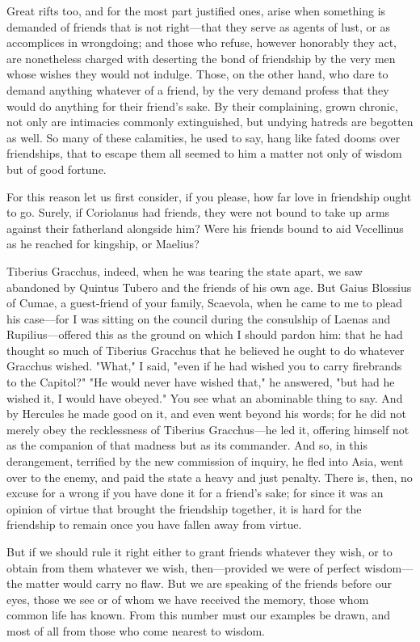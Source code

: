  Great rifts too, and for the most part justified ones, arise when something is demanded of friends that is not right—that they serve as agents of lust, or as accomplices in wrongdoing; and those who refuse, however honorably they act, are nonetheless charged with deserting the bond of friendship by the very men whose wishes they would not indulge. Those, on the other hand, who dare to demand anything whatever of a friend, by the very demand profess that they would do anything for their friend's sake. By their complaining, grown chronic, not only are intimacies commonly extinguished, but undying hatreds are begotten as well. So many of these calamities, he used to say, hang like fated dooms over friendships, that to escape them all seemed to him a matter not only of wisdom but of good fortune.

 For this reason let us first consider, if you please, how far love in friendship ought to go. Surely, if Coriolanus had friends, they were not bound to take up arms against their fatherland alongside him? Were his friends bound to aid Vecellinus as he reached for kingship, or Maelius?

 Tiberius Gracchus, indeed, when he was tearing the state apart, we saw abandoned by Quintus Tubero and the friends of his own age. But Gaius Blossius of Cumae, a guest-friend of your family, Scaevola, when he came to me to plead his case—for I was sitting on the council during the consulship of Laenas and Rupilius—offered this as the ground on which I should pardon him: that he had thought so much of Tiberius Gracchus that he believed he ought to do whatever Gracchus wished. "What," I said, "even if he had wished you to carry firebrands to the Capitol?" "He would never have wished that," he answered, "but had he wished it, I would have obeyed." You see what an abominable thing to say. And by Hercules he made good on it, and even went beyond his words; for he did not merely obey the recklessness of Tiberius Gracchus—he led it, offering himself not as the companion of that madness but as its commander. And so, in this derangement, terrified by the new commission of inquiry, he fled into Asia, went over to the enemy, and paid the state a heavy and just penalty. There is, then, no excuse for a wrong if you have done it for a friend's sake; for since it was an opinion of virtue that brought the friendship together, it is hard for the friendship to remain once you have fallen away from virtue.

 But if we should rule it right either to grant friends whatever they wish, or to obtain from them whatever we wish, then—provided we were of perfect wisdom—the matter would carry no flaw. But we are speaking of the friends before our eyes, those we see or of whom we have received the memory, those whom common life has known. From this number must our examples be drawn, and most of all from those who come nearest to wisdom.

